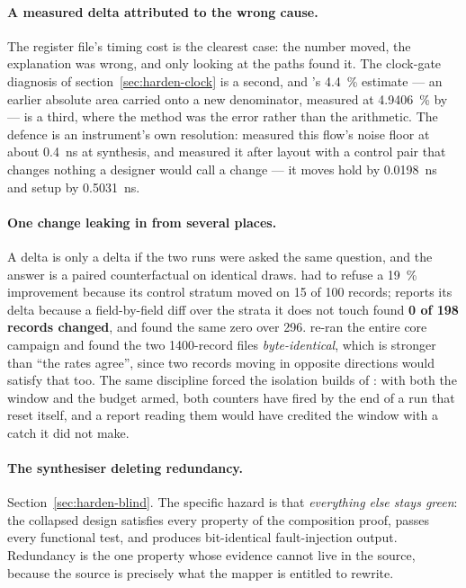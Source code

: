 \paragraph{A measured delta attributed to the wrong cause.}
The register file's timing cost is the clearest case: the number moved,
the explanation was wrong, and only looking at the paths found it. The
clock-gate diagnosis of section~\ref{sec:harden-clock} is a second, and
's \SI{+4.4}{\percent} estimate --- an earlier absolute area
carried onto a new denominator, measured at \SI{+4.9406}{\percent} by
 --- is a third, where the method was the error
rather than the arithmetic. The defence is an
instrument's own resolution:  measured this
flow's noise floor at about \SI{0.4}{\nano\second} at synthesis, and
 measured it after layout with a control pair that changes
nothing a designer would call a change --- it moves hold by
\SI{0.0198}{\nano\second} and setup by \SI{0.5031}{\nano\second}.

\paragraph{One change leaking in from several places.}
A delta is only a delta if the two runs were asked the same question,
and the answer is a paired counterfactual on identical draws.
 had to refuse a \SI{19}{\percent} improvement
because its control stratum moved on 15 of 100 records; 
reports its delta because a field-by-field diff over the strata it does
not touch found \textbf{0 of 198 records changed}, and  found
the same zero over 296.  re-ran the entire core campaign and found the two
\num{1400}-record files \emph{byte-identical}, which is stronger than
``the rates agree'', since two records moving in opposite directions
would satisfy that too. The same discipline forced the isolation builds
of : with both the window and the budget armed,
both counters have fired by the end of a run that reset itself, and a
report reading them would have credited the window with a catch it did
not make.

\paragraph{The synthesiser deleting redundancy.}
Section~\ref{sec:harden-blind}. The specific hazard is that
\emph{everything else stays green}: the collapsed design satisfies every
property of the composition proof, passes every functional test, and
produces bit-identical fault-injection output. Redundancy is the one
property whose evidence cannot live in the source, because the source is
precisely what the mapper is entitled to rewrite.

